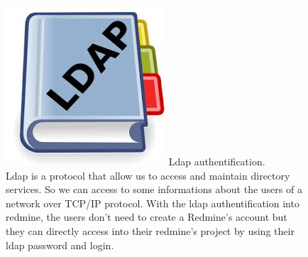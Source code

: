 \begin{figure}[h]
		\includegraphics[scale=0.1]{Images/ldap.jpeg} 
		Ldap authentification. \\
		Ldap is a protocol that allow us to access and maintain directory services. So we can access to some informations about the users of a network over TCP/IP protocol. 
		With the ldap authentification into redmine, the users don't need to create a Redmine's account but they can directly access into their redmine's project by using their ldap password and login.   
	\end{figure} 



\newpage

\cleardoublepage


